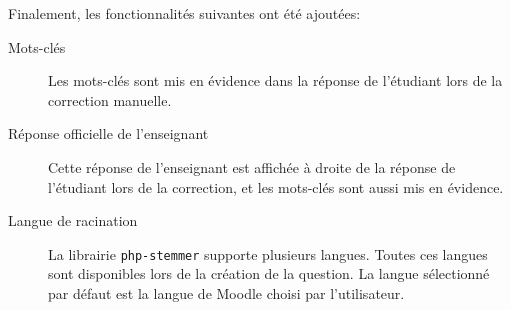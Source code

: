 Finalement, les fonctionnalit\'es suivantes ont \'et\'e ajout\'ees:
\begin{description}
  \item[Mots-cl\'es]
  
  Les mots-cl\'es sont mis en \'evidence dans la r\'eponse de l'\'etudiant lors de la correction manuelle.
  
  \item[R\'eponse officielle de l'enseignant]
  
  Cette r\'eponse de l'enseignant est 
  affich\'ee \`a droite de la r\'eponse de l'\'etudiant lors de la correction, et
  les mots-cl\'es sont aussi mis en \'evidence.
  
  \item[Langue de racination]
  
  La librairie \texttt{php-stemmer} supporte plusieurs langues.
  Toutes ces langues sont disponibles lors de la cr\'eation de la question.
  La langue s\'electionn\'e par d\'efaut est la langue de Moodle choisi par l'utilisateur.
\end{description}
